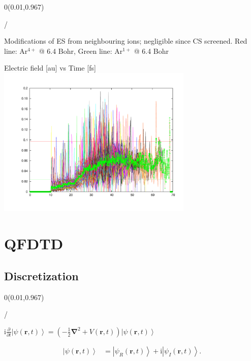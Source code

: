 \documentclass{beamer}
\makeatletter
\newcommand{\framenumber}{
\begin{textblock}{0}(0.01,0.967)
\begin{scriptsize}
{\color{gray}\insertframenumber/\inserttotalframenumber}
\end{scriptsize}
\end{textblock}
}
\newcommand{\im}{\textrm{i}}
\newcommand{\vecnabla}{\bm{\nabla}}
\newcommand{\laplacien}[1]{\vecnabla^2 #1}
\newcommand{\del}{\partial}                                     %
\newcommand{\delt}[1]{\frac{\del #1}{\del t}}                   %
\newcommand{\ve}[1]{\textbf{#1}}
\newcommand{\vecr}{\ve{r}}
\newcommand{\pa}[1]{\left( #1 \right)}
\newcommand{\ket}[1]{\left| #1 \right>}
\makeatother
\begin{document}
\begin{frame}{}\framenumber
Modifications of ES from neighbouring ions; negligible since CS screened.
Red line: Ar$^{4+}$ @ 6.4 Bohr, Green line: Ar$^{1+}$ @ 6.4 Bohr
\begin{center}
Electric field [au] vs Time [fs] \\
\includegraphics[width=0.7\textwidth]{figures/appendix/screened_charge}
\end{center}
\end{frame}



\section{QFDTD}
\subsection{Discretization}
\begin{frame}{}\framenumber
\begin{center}
$\im \delt{} \ket{ \psi\pa{\vecr,t} } = \pa{ - \frac{1}{2} \laplacien{} + V\pa{\vecr,t} } \ket{ \psi\pa{\vecr,t} }$

\begin{align}
\ket{ \psi\pa{\vecr,t} } & =        \ket{ \psi_R\pa{\vecr,t} }
                            + \im \ket{ \psi_I\pa{\vecr,t} } .
\end{align}

\end{center}
\end{frame}
\end{document}
